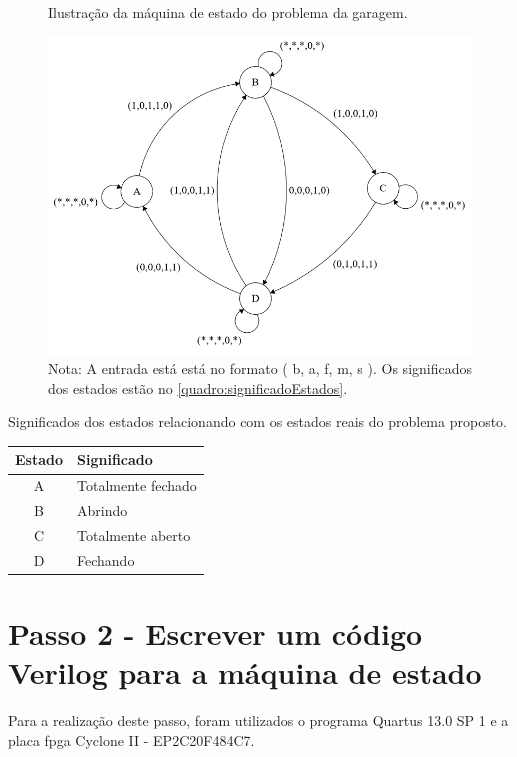 		\begin{figure}[H]
			 \centering
			 \caption{\label{figura:maquinaDeEstado}Ilustração da máquina de estado do problema da garagem.}
			 \includegraphics[width=1\textwidth]{img/maquina/maquinaEstado}
			 \caption*{Nota: A entrada está está no formato ( b, a, f, m, s ). Os
			  significados dos estados estão no \autoref{quadro:significadoEstados}.}
		\end{figure}

		\begin{quadro}[H]
			\centering
			\caption{Significados dos estados relacionando com os estados reais do problema proposto.}
			\label{quadro:significadoEstados}
			\begin{tabular}{|c|l|}
			  \hline
			   \textbf{Estado} & \textbf{Significado}\\
			    \hline
				   A & Totalmente fechado \\
			   	\hline
			   		B & Abrindo \\
			    \hline
					C & Totalmente aberto \\
			    \hline
			    	D & Fechando \\
			    \hline
			\end{tabular}
		\end{quadro}

	\section{Passo 2 - Escrever um código Verilog para a máquina de estado}
		Para a realização deste passo, foram utilizados o programa Quartus 13.0 SP 1
		 e a placa \ac{fpga} Cyclone II - EP2C20F484C7.

